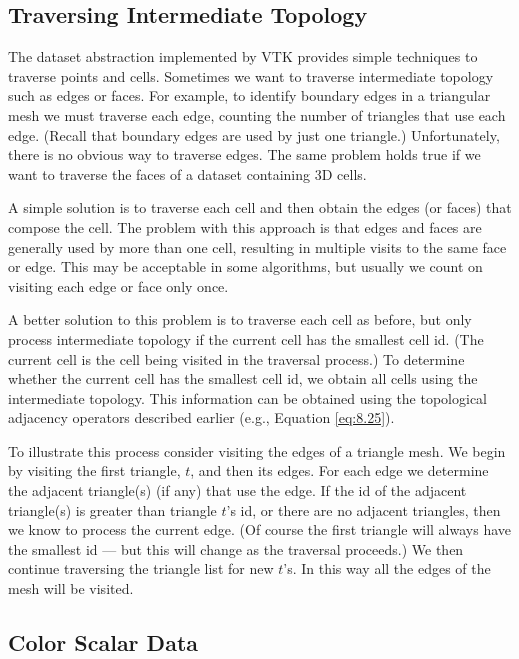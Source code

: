 
\subsection{Traversing Intermediate Topology}

The dataset abstraction implemented by VTK provides simple techniques to traverse points and cells. Sometimes we want to traverse intermediate topology such as edges or faces. For example, to identify boundary edges in a triangular mesh we must traverse each edge, counting the number of triangles that use each edge. (Recall that boundary edges are used by just one triangle.) Unfortunately, there is no obvious way to traverse edges. The same problem holds true if we want to traverse the faces of a dataset containing 3D cells.

A simple solution is to traverse each cell and then obtain the edges (or faces) that compose the cell. The problem with this approach is that edges and faces are generally used by more than one cell, resulting in multiple visits to the same face or edge. This may be acceptable in some algorithms, but usually we count on visiting each edge or face only once.

A better solution to this problem is to traverse each cell as before, but only process intermediate topology if the current cell has the smallest cell id. (The current cell is the cell being visited in the traversal process.) To determine whether the current cell has the smallest cell id, we obtain all cells using the intermediate topology. This information can be obtained using the topological adjacency operators described earlier (e.g., Equation \ref{eq:8.25}).

To illustrate this process consider visiting the edges of a triangle mesh. We begin by visiting the first triangle, $t$, and then its edges. For each edge we determine the adjacent triangle(s) (if any) that use the edge. If the id of the adjacent triangle(s) is greater than triangle $t$'s id, or there are no adjacent triangles, then we know to process the current edge. (Of course the first triangle will always have the smallest id  --- but this will change as the traversal proceeds.) We then continue traversing the triangle list for new $t$'s. In this way all the edges of the mesh will be visited.

\subsection{Color Scalar Data}

